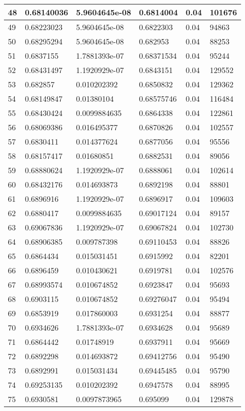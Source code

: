 \begin{longtable}{|l|l|l|l|l|l|}
48 & 0.68140036 & 5.9604645e-08 & 0.6814004 & 0.04 & 101676 \\ \hline 
49 & 0.68223023 & 5.9604645e-08 & 0.6822303 & 0.04 & 94863 \\ \hline 
50 & 0.68295294 & 5.9604645e-08 & 0.682953 & 0.04 & 88253 \\ \hline 
51 & 0.6837155 & 1.7881393e-07 & 0.68371534 & 0.04 & 95244 \\ \hline 
52 & 0.68431497 & 1.1920929e-07 & 0.6843151 & 0.04 & 129552 \\ \hline 
53 & 0.682857 & 0.010202392 & 0.6850832 & 0.04 & 129362 \\ \hline 
54 & 0.68149847 & 0.01380104 & 0.68575746 & 0.04 & 116484 \\ \hline 
55 & 0.68430424 & 0.0099884635 & 0.6864338 & 0.04 & 122861 \\ \hline 
56 & 0.68069386 & 0.016495377 & 0.6870826 & 0.04 & 102557 \\ \hline 
57 & 0.6830411 & 0.014377624 & 0.6877056 & 0.04 & 95556 \\ \hline 
58 & 0.68157417 & 0.01680851 & 0.6882531 & 0.04 & 89056 \\ \hline 
59 & 0.68880624 & 1.1920929e-07 & 0.6888061 & 0.04 & 102614 \\ \hline 
60 & 0.68432176 & 0.014693873 & 0.6892198 & 0.04 & 88801 \\ \hline 
61 & 0.6896916 & 1.1920929e-07 & 0.6896917 & 0.04 & 109603 \\ \hline 
62 & 0.6880417 & 0.0099884635 & 0.69017124 & 0.04 & 89157 \\ \hline 
63 & 0.69067836 & 1.1920929e-07 & 0.69067824 & 0.04 & 102730 \\ \hline 
64 & 0.68906385 & 0.009787398 & 0.69110453 & 0.04 & 88826 \\ \hline 
65 & 0.6864434 & 0.015031451 & 0.6915992 & 0.04 & 82201 \\ \hline 
66 & 0.6896459 & 0.010430621 & 0.6919781 & 0.04 & 102576 \\ \hline 
67 & 0.68993574 & 0.010674852 & 0.6923847 & 0.04 & 95693 \\ \hline 
68 & 0.6903115 & 0.010674852 & 0.69276047 & 0.04 & 95494 \\ \hline 
69 & 0.6853919 & 0.017860003 & 0.6931254 & 0.04 & 88877 \\ \hline 
70 & 0.6934626 & 1.7881393e-07 & 0.6934628 & 0.04 & 95689 \\ \hline 
71 & 0.6864442 & 0.01748919 & 0.6937911 & 0.04 & 95669 \\ \hline 
72 & 0.6892298 & 0.014693872 & 0.69412756 & 0.04 & 95490 \\ \hline 
73 & 0.6892991 & 0.015031434 & 0.69445485 & 0.04 & 95790 \\ \hline 
74 & 0.69253135 & 0.010202392 & 0.6947578 & 0.04 & 88995 \\ \hline 
75 & 0.6930581 & 0.0097873965 & 0.695099 & 0.04 & 129878 \\ \hline 
\end{longtable}